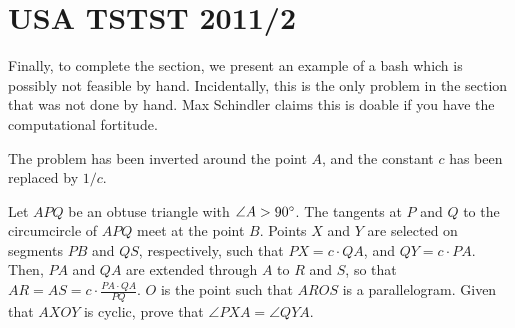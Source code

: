 \section{USA TSTST 2011/2}
Finally, to complete the section, we present an example of a bash which is possibly not feasible by hand.  Incidentally, this is the only problem in the section that was not done by hand.  Max Schindler claims this is doable if you have the computational fortitude.

The problem has been inverted around the point $A$, and the constant $c$ has been replaced by $1/c$.

\secps
\begin{problem}
  Let $APQ$ be an obtuse triangle with $\angle A > 90^\circ$.  The tangents at $P$ and $Q$ to the circumcircle of $APQ$ meet at the point $B$.  Points $X$ and $Y$ are selected on segments $PB$ and $QS$, respectively, such that $PX = c \cdot QA$, and $QY = c \cdot PA$.  Then, $PA$ and $QA$ are extended through $A$ to $R$ and $S$, so that $AR = AS = c \cdot \frac{PA \cdot QA}{PQ}$.  $O$ is the point such that $AROS$ is a parallelogram.   Given that $AXOY$ is cyclic, prove that $\angle PXA = \angle QYA$.
\end{problem}


